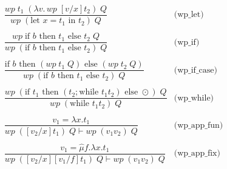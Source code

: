 \documentclass[10pt,a4paper]{article}
\newcommand{\himpl}{\vdash}
\begin{document}
\begin{multicols}{2}
\[\begin{array}{cl}
  \dfrac{ wp\;t_1\;(\lambda v.\,wp\;[v/x]t_2)\;Q}
  { wp\;(\text{let }x = t_1\text{ in }t_2)\;Q } & \text{(wp\_let)} \\
\\
  \dfrac{ wp\;\text{if }b\text{ then }t_1\text{ else }t_2\;Q }
  {wp\; (\text{if }b\text{ then }t_1\text{ else }t_2)\;Q} & \text{(wp\_if)} \\
  \\

  \dfrac{\text{if } b \text{ then } (wp\;t_1\;Q) \text{ else } (wp\;t_2\;Q)}
{wp\;(\text{if }b\text{ then }t_1\text{ else }t_2) \;Q}
                     & \text{(wp\_if\_case)} \\
  \\
\dfrac{
  wp\; (\text{if } t_1 \text{ then } (t_2;\text{while } t_1 t_2) \text{ else }\odot)\;Q}
{wp\;(\text{while } t_1 t_2)\;Q
  } & \text{(wp\_while)} \\
 \\
  \dfrac{v_1 = \lambda{x}. t_1}
  { wp\;([v_2/x]t_1)\;Q \himpl wp\;(v_1 v_2)\;Q} & \text{(wp\_app\_fun)} \\
   \\
  \dfrac{v_1 = \hat{\mu}f.\lambda{x}.t_1}
  { wp\;([v_2/x][v_1/f]t_1)\;Q \himpl wp\;(v_1 v_2)\;Q} & \text{(wp\_app\_fix)} \\ 
\end{array}
\]



\end{multicols}
\end{document}
